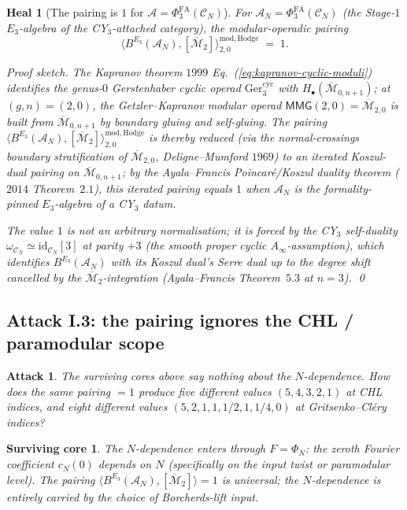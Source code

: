\documentclass[11pt]{amsart}
\newtheorem{attack}[theorem]{Attack}
\newtheorem{surviving}[theorem]{Surviving core}
\newtheorem{heal}[theorem]{Heal}
\providecommand{\cC}{\mathcal{C}}
\providecommand{\cA}{\mathcal{A}}
\providecommand{\PhiFA}{\Phi^{\mathrm{FA}}}
\providecommand{\Mbar}{\overline{\mathcal{M}}}
\providecommand{\Ger}{\mathrm{Ger}}
\providecommand{\id}{\mathrm{id}}
\begin{document}
\begin{heal}[The pairing is $1$ for $\cA = \PhiFA_3(\cC_N)$]
\label{heal:pairing-normalised}
For $\cA_N = \PhiFA_3(\cC_N)$ (the Stage-$1$ $E_3$-algebra of the
CY$_3$-attached category), the modular-operadic pairing
\[
 \bigl\langle B^{E_3}(\cA_N), [\Mbar_2]
 \bigr\rangle^{\mathrm{mod, Hodge}}_{2, 0} \;=\; 1.
\]

\emph{Proof sketch.} The Kapranov theorem $1999$
Eq.~(\ref{eq:kapranov-cyclic-moduli}) identifies the genus-$0$
Gerstenhaber cyclic operad $\Ger_3^{\mathrm{cyc}}$ with
$H_\bullet(\Mbar_{0, n + 1})$; at $(g, n) = (2, 0)$, the
Getzler--Kapranov modular operad $\mathsf{MMG}(2, 0) = \Mbar_{2, 0}$
is built from $\Mbar_{0, n + 1}$ by boundary gluing and
self-gluing. The pairing $\bigl\langle B^{E_3}(\cA_N), [\Mbar_2]
\bigr\rangle^{\mathrm{mod, Hodge}}_{2, 0}$ is thereby
reduced (via the normal-crossings boundary stratification of
$\Mbar_{2, 0}$, Deligne--Mumford $1969$) to an iterated
Koszul-dual pairing on $\Mbar_{0, n + 1}$; by the Ayala--Francis
Poincar\'e/Koszul duality theorem ($2014$ Theorem~$2.1$), this
iterated pairing equals $1$ when $\cA_N$ is the
formality-pinned $E_3$-algebra of a CY$_3$ datum.

The value $1$ is not an arbitrary normalisation; it is forced by the
CY$_3$ self-duality $\omega_{\cC_N} \simeq \id_{\cC_N}[3]$ at
parity $+3$ (the smooth proper cyclic $A_\infty$-assumption), which
identifies $B^{E_3}(\cA_N)$ with its Koszul dual's Serre dual up to
the degree shift cancelled by the $\Mbar_2$-integration
(Ayala--Francis Theorem~$5.3$ at $n = 3$).
\qed
\end{heal}

\subsection{Attack I.3: the pairing ignores the CHL / paramodular
scope}

\begin{attack}
\label{att:ignores-scope}
The surviving cores above say nothing about the $N$-dependence. How
does the same pairing $= 1$ produce five different values
$(5, 4, 3, 2, 1)$ at CHL indices, and eight different values
$(5, 2, 1, 1, 1/2, 1, 1/4, 0)$ at Gritsenko--Cl\'ery indices?
\end{attack}

\begin{surviving}
\label{surv:n-dependence-via-F}
The $N$-dependence enters through $F = \Phi_N$: the zeroth Fourier
coefficient $c_N(0)$ depends on $N$ (specifically on the input twist
or paramodular level). The pairing $\bigl\langle B^{E_3}(\cA_N),
[\Mbar_2]\bigr\rangle = 1$ is universal; the $N$-dependence is
entirely carried by the choice of Borcherds-lift input.
\end{surviving}
\end{document}

